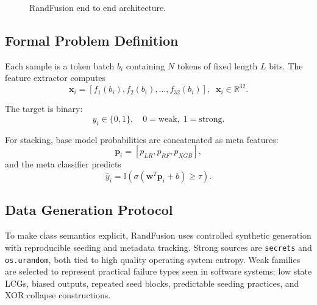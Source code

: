 \documentclass[conference]{IEEEtran}
\begin{document}
\begin{figure}[t]
{%
}
\caption{RandFusion end to end architecture.}
\label{fig:architecture}
\end{figure}

\subsection{Formal Problem Definition}
Each sample is a token batch $b_i$ containing $N$ tokens of fixed length $L$ bits. The feature extractor computes
\begin{equation}
\mathbf{x}_i = [f_1(b_i), f_2(b_i), \ldots, f_{32}(b_i)], \;\; \mathbf{x}_i \in \mathbb{R}^{32}.
\end{equation}

The target is binary:
\begin{equation}
y_i \in \{0,1\}, \quad 0=\text{weak}, \; 1=\text{strong}.
\end{equation}

For stacking, base model probabilities are concatenated as meta features:
\begin{equation}
\mathbf{p}_i=[p_{LR},p_{RF},p_{XGB}],
\end{equation}
and the meta classifier predicts
\begin{equation}
\hat{y}_i = \mathbb{I}\left(\sigma(\mathbf{w}^{T}\mathbf{p}_i + b) \geq \tau\right).
\end{equation}

\subsection{Data Generation Protocol}
To make class semantics explicit, RandFusion uses controlled synthetic generation with reproducible seeding and metadata tracking. Strong sources are \texttt{secrets} and \texttt{os.urandom}, both tied to high quality operating system entropy. Weak families are selected to represent practical failure types seen in software systems: low state LCGs, biased outputs, repeated seed blocks, predictable seeding practices, and XOR collapse constructions.
\end{document}
